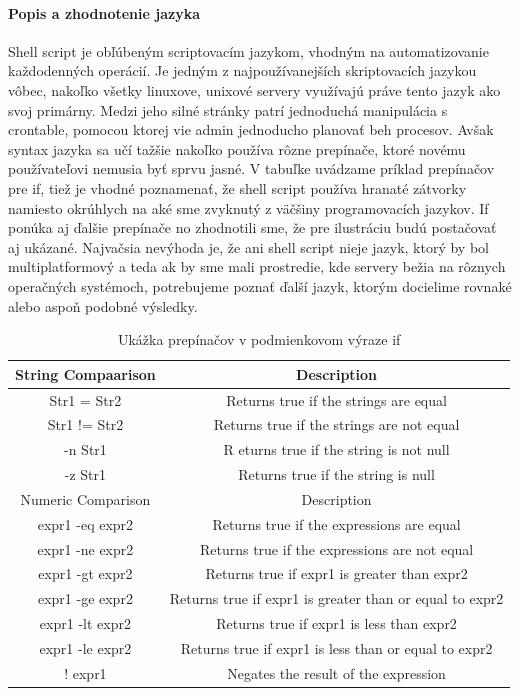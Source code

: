 \paragraph{Popis a zhodnotenie jazyka}
\noindent
Shell script je obľúbeným scriptovacím jazykom, vhodným na automatizovanie každodenných operácií. Je jedným z najpoužívanejších skriptovacích jazykou vôbec, nakoľko všetky linuxove, unixové servery využívajú práve tento jazyk ako svoj primárny.
Medzi jeho silné stránky patrí jednoduchá manipulácia s crontable, pomocou ktorej vie admin jednoducho planovať beh procesov.
Avšak syntax jazyka sa učí tažšie nakoľko používa rôzne prepínače, ktoré novému používateľovi nemusia byť sprvu jasné.
V tabuľke uvádzame príklad prepínačov pre if, tiež je vhodné poznamenať, že shell script používa hranaté zátvorky namiesto okrúhlych na aké sme zvyknutý z väčšiny programovacích jazykov. If ponúka aj ďalšie prepínače no zhodnotili sme, že pre ilustráciu budú postačovať aj ukázané.
Najvačsia nevýhoda je, že ani shell script nieje jazyk, ktorý by bol multiplatformový a teda ak by sme mali prostredie, kde servery bežia na rôznych operačných systémoch, potrebujeme poznať ďalší jazyk, ktorým docielime rovnaké alebo aspoň podobné výsledky.
\newline
\begin{table}[h!]
	\centering
	\begin{tabular}{| c | c | }
		\hline
		String Compaarison	&Description\\
		\hline
		Str1 = Str2	& Returns true if the strings are equal\\ 
		\hline
		Str1 != Str2 &	Returns true if the strings are not equal\\ 
		\hline
		-n Str1	 &R eturns true if the string is not null\\ 
		\hline
		-z Str1	& Returns true if the string is null\\
		\hline
		\hline
		Numeric Comparison	&Description\\
		\hline
		expr1 -eq expr2	& Returns true if the expressions are equal\\
		\hline
		expr1 -ne expr2	& Returns true if the expressions are not equal\\
		\hline
		expr1 -gt expr2	& Returns true if expr1 is greater than expr2\\
		\hline
		expr1 -ge expr2	& Returns true if expr1 is greater than or equal to expr2\\
		\hline
		expr1 -lt expr2	& Returns true if expr1 is less than expr2\\
		\hline
		expr1 -le expr2	& Returns true if expr1 is less than or equal to expr2\\
		\hline
		! expr1	& Negates the result of the expression\\
		\hline
	\end{tabular}
	\caption{Ukážka prepínačov v podmienkovom výraze if}
	\label{table:1}
\end{table}
\newpage

